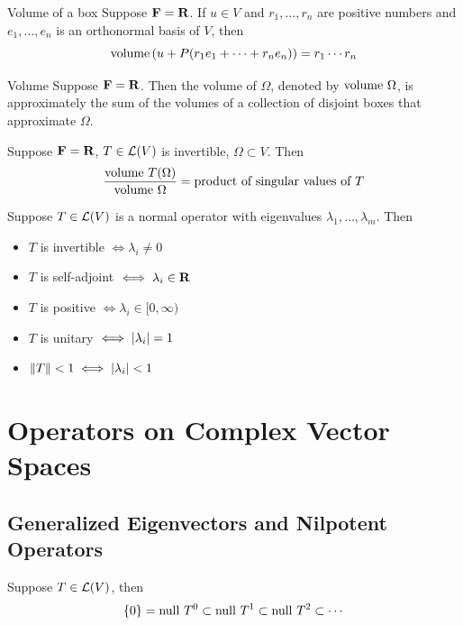 \documentclass[12pt,a4paper]{article}
\begin{document}
    \begin{defi}{Volume of a box}
        Suppose $\mathbf{F}=\mathbf{R}$. If $u\in V$ and $r_1,\dots,r_n$ are positive numbers and $e_1,\dots,e_n$ is an orthonormal basis of $V$, then
        $$
        \operatorname{volume\,}(u+P(r_1e_1+\cdots+r_ne_n))=r_1\cdots r_n
        $$
    \end{defi}
    \begin{defi}{Volume}\addelement{$\volume\Omega$}
        Suppose $\mathbf{F}=\mathbf{R}$. Then the volume of $\Omega$, denoted by $\volume\Omega$, is approximately the sum of the volumes of a collection of disjoint boxes that approximate $\Omega$.
    \end{defi}
    \hfill

    \begin{prop}
        Suppose $\mathbf{F}=\mathbf{R}$, $T\in\mathcal{L}(V)$ is invertible, $\Omega\subset V$. Then 
        $$
        \frac{\operatorname{volume\,} T(\Omega)}{\operatorname{volume\,} \Omega}=\text{product of singular values of } T
        $$
    \end{prop}
    \hfill
    
    \begin{prop}
    	Suppose $T\in\mathcal{L}(V)$ is a normal operator with eigenvalues $\lambda_1,\dots,\lambda_m$. Then
		\begin{itemize}
			\item $T$ is invertible $\iff\lambda_i\neq0$
			\item $T$ is self-adjoint $\iff\lambda_i\in\mathbf{R}$
			\item $T$ is positive $\iff\lambda_i\in[0,\infty)$
			\item $T$ is unitary $\iff\left\lvert \lambda_i\right\rvert=1$
			\item $\left\lVert T\right\rVert<1\iff\left\lvert \lambda_i\right\rvert<1$
		\end{itemize}    	
    \end{prop}
    \hfill
    
    \section{Operators on Complex Vector Spaces}
    \subsection{Generalized Eigenvectors and Nilpotent Operators}
    \begin{prop}
    	Suppose $T\in\mathcal{L}(V)$, then
    	$$
    	\left\{0\right\}=\operatorname{null\,} T^0\subset\operatorname{null\,} T^1\subset\operatorname{null\,} T^2\subset\cdots
    	$$
    \end{prop}
    \hfill
    
\end{document}
